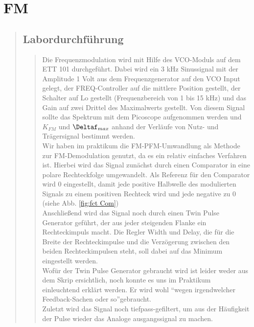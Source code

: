 \section{FM}
\begin{quote}
    
    
    \subsection{Labordurchführung}
    \begin{quote}
    
        Die Frequenzmodulation wird mit Hilfe des VCO-Moduls auf dem ETT 101
        durchgeführt. Dabei wird ein 3 kHz Sinussignal mit der Amplitude 1
        Volt aus dem Frequenzgenerator auf den VCO Input gelegt, der FREQ-Controller auf
        die mittlere Position gestellt, der Schalter auf Lo gestellt
        (Frequenzbereich von 1 bis 15 kHz) und das Gain auf zwei Drittel des
        Maximalwerts gestellt.
        Von diesem Signal sollte das Spektrum mit dem Picoscope aufgenommen
        werden und $K_{FM}$ und $\Deltaf_{max}$ anhand der Verläufe von Nutz-
        und Trägersignal bestimmt werden.\\
         Wir haben im praktikum die
        FM-PFM-Umwandlung als Methode zur FM-Demodulation genutzt, da es ein relativ einfaches Verfahren ist. 
        Hierbei wird das Signal zunächst durch einen Comparator in eine polare Rechteckfolge umgewandelt. 
        Als Referenz für den Comparator wird \si{0}{\volt} eingestellt, damit
        jede positive Halbwelle des modulierten Signals zu einem positiven 
        Rechteck wird und jede negative zu \si{0}{\volt} (siehe Abb.
        \ref{fig:fct Com})\\
        Anschließend wird das Signal noch durch einen Twin Pulse Generator geführt, der aus jeder steigenden Flanke ein
        Rechteckimpuls macht. Die Regler Width und Delay, die für die Breite
        der Rechteckimpulse und die Verzögerung zwischen den beiden
        Rechteckimpulsen steht, soll dabei auf das Minimum eingestellt werden.\\
        Wofür der Twin Pulse Generator gebraucht wird ist leider weder aus dem Skrip ersichtlich,
        noch konnte es uns im Praktikum einleuchtend erklärt werden. Er wird
        wohl ``wegen irgendwelcher Feedback-Sachen oder so''\footnotemark gebraucht.\\
        Zuletzt wird das Signal noch tiefpass-gefiltert, um aus der Häufigkeit der Pulse wieder das Analoge ausgangssignal zu
        machen.
        

\end{quote}
\end{quote}
